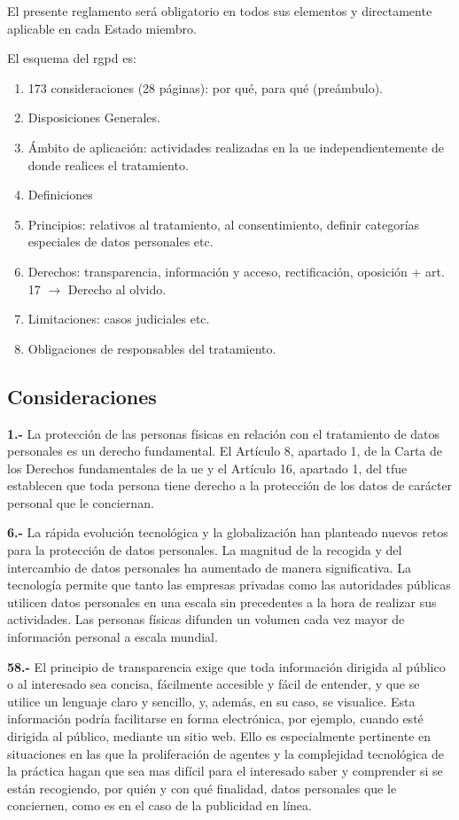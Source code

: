 El presente reglamento será obligatorio en todos sus elementos y directamente aplicable en cada Estado miembro.

El esquema del \gls{rgpd} es:
\begin{enumerate}
    \item 173 consideraciones (28 páginas): por qué, para qué (preámbulo).
    \item Disposiciones Generales.
    \item Ámbito de aplicación: actividades realizadas en la \gls{ue} independientemente de donde realices el tratamiento.
    \item Definiciones
    \item Principios: relativos al tratamiento, al consentimiento, definir categorías especiales de datos personales etc.
    \item Derechos: transparencia, información y acceso, rectificación, oposición + art. 17 $\rightarrow$ Derecho al olvido.
    \item Limitaciones: casos judiciales etc.
    \item Obligaciones de responsables del tratamiento.
\end{enumerate}

\subsection{Consideraciones}

\textbf{1.-} La protección de las personas físicas en relación con el tratamiento de datos personales es un derecho fundamental. El Artículo 8, apartado 1, de la Carta de los Derechos fundamentales de la \gls{ue} y el Artículo 16, apartado 1, del \gls{tfue} establecen que toda persona tiene derecho a la protección de los datos de carácter personal que le conciernan.

\textbf{6.-} La rápida evolución tecnológica y la globalización han planteado nuevos retos para la protección de datos personales. La magnitud de la recogida y del intercambio de datos personales ha aumentado de manera significativa.
La tecnología permite que tanto las empresas privadas como las autoridades públicas utilicen datos personales en una escala sin precedentes a la hora de realizar sus actividades. Las personas físicas difunden un volumen cada vez mayor de información personal a escala mundial.

\textbf{58.-} El principio de transparencia exige que toda información dirigida al público o al interesado sea concisa, fácilmente accesible y fácil de entender, y que se utilice un lenguaje claro y sencillo, y, además, en su caso, se visualice.
Esta información podría facilitarse en forma electrónica, por ejemplo, cuando esté dirigida al público, mediante un sitio web. Ello es especialmente pertinente en situaciones en las que la proliferación de agentes y la complejidad tecnológica de la práctica hagan que sea mas difícil para el interesado saber y comprender si se están recogiendo, por quién y con qué finalidad, datos personales que le conciernen, como es en el caso de la publicidad en línea.

